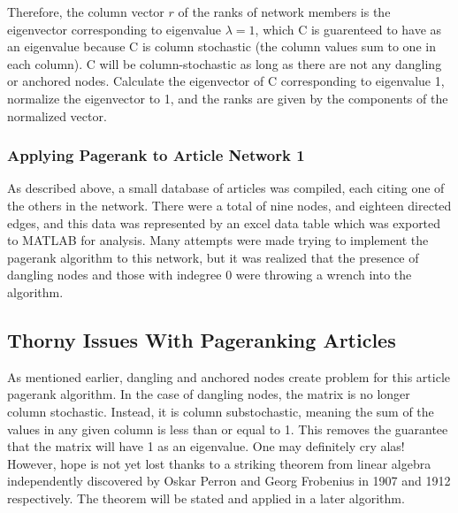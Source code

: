 \documentclass[17pt]{extarticle}
\begin{document}
  Therefore, the column vector $r$ of the ranks of network members is the eigenvector corresponding to eigenvalue 
  $\lambda = 1$, which C is guarenteed to have as an eigenvalue because C is column stochastic (the column values sum to one in each column). C will be column-stochastic as long as there are not any dangling or anchored nodes. Calculate the eigenvector of C corresponding to eigenvalue 1, normalize the eigenvector to 1, and the ranks are given by the components of the normalized vector.\\
  
    \subsubsection{Applying Pagerank to Article Network 1}
    
    \indent As described above, a small database of articles was compiled, each citing one of the others in the network. There were a total of nine nodes, and eighteen directed edges, and this data was represented by an excel data table which was exported to MATLAB for analysis. Many attempts were made trying to implement the pagerank algorithm to this network, but it was realized that the presence of dangling nodes and those with indegree 0 were throwing a wrench into the algorithm. 
    
  \subsection{Thorny Issues With Pageranking Articles}
    As mentioned earlier, dangling and anchored nodes create problem for this article pagerank algorithm. In the case of dangling nodes, the matrix is no longer column stochastic. Instead, it is column substochastic, meaning the sum of the values in any given column is less than or equal to 1. This removes the guarantee that the matrix will have 1 as an eigenvalue. One may definitely cry alas! However, hope is not yet lost thanks to a striking theorem from linear algebra independently discovered by Oskar Perron and Georg Frobenius in 1907 and 1912 respectively. The theorem will be stated and applied in a later algorithm.
    
\end{document}
